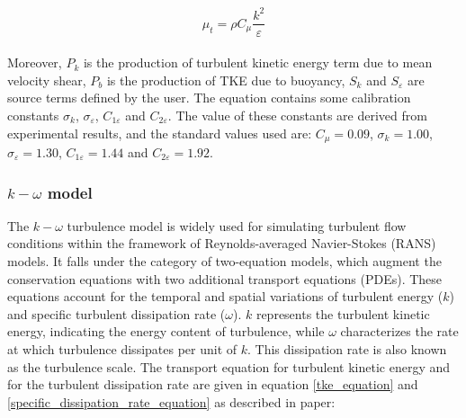 \documentclass[a5paper]{sapthesis}
\begin{document}
	\begin{equation}
		\mu_t = \rho C_{\mu} \frac{k^2}{\varepsilon}
	\end{equation}
	\\
	Moreover, $P_k$ is the production of turbulent kinetic energy term due to mean velocity shear, $P_b$ is the production of TKE due to buoyancy, $S_k$ and $S_\varepsilon$ are source terms defined by the user. The equation contains some calibration constants $\sigma_k$, $\sigma_{\varepsilon}$, $C_{1\varepsilon}$ and $C_{2\varepsilon}$. The value of these constants are derived from experimental results, and the standard values used are:
	$C_{\mu }=0.09$, $\sigma_k = 1.00$, $\sigma_{\varepsilon} = 1.30$, $C_{1\varepsilon} = 1.44$ and $C_{2\varepsilon} = 1.92$.
	
	\subsubsection{$k-\omega$ model}
	The $k-\omega$ turbulence model is widely used for simulating turbulent flow conditions within the framework of Reynolds-averaged Navier-Stokes (RANS) models. It falls under the category of two-equation models, which augment the conservation equations with two additional transport equations (PDEs). These equations account for the temporal and spatial variations of turbulent energy ($k$) and specific turbulent dissipation rate ($\omega$). $k$ represents the turbulent kinetic energy, indicating the energy content of turbulence, while $\omega$ characterizes the rate at which turbulence dissipates per unit of $k$. This dissipation rate is also known as the turbulence scale.
	The transport equation for turbulent kinetic energy  and for the turbulent dissipation rate are given in equation \ref{tke_equation} and \ref{specific_dissipation_rate_equation} as described in \citet{Wlicox_k-omega_model} paper:
	
\end{document}
